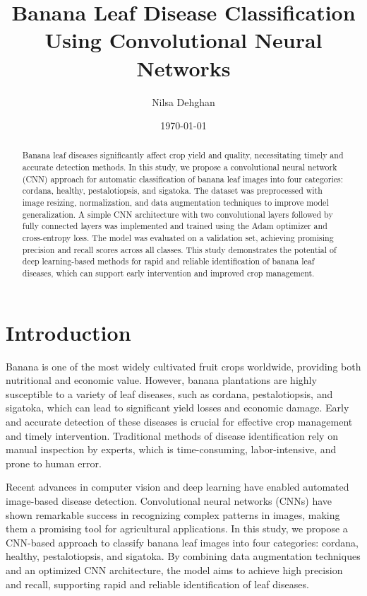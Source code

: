 \documentclass[11pt]{article}
\title{Banana Leaf Disease Classification Using Convolutional Neural Networks}
\author{Nilsa Dehghan}
\date{\today}
\begin{document}
\maketitle

\begin{abstract}
Banana leaf diseases significantly affect crop yield and quality, necessitating timely and accurate detection methods. In this study, we propose a convolutional neural network (CNN) approach for automatic classification of banana leaf images into four categories: cordana, healthy, pestalotiopsis, and sigatoka. The dataset was preprocessed with image resizing, normalization, and data augmentation techniques to improve model generalization. A simple CNN architecture with two convolutional layers followed by fully connected layers was implemented and trained using the Adam optimizer and cross-entropy loss. The model was evaluated on a validation set, achieving promising precision and recall scores across all classes. This study demonstrates the potential of deep learning-based methods for rapid and reliable identification of banana leaf diseases, which can support early intervention and improved crop management.
\end{abstract}

\section{Introduction}
Banana is one of the most widely cultivated fruit crops worldwide, providing both nutritional and economic value. However, banana plantations are highly susceptible to a variety of leaf diseases, such as cordana, pestalotiopsis, and sigatoka, which can lead to significant yield losses and economic damage. Early and accurate detection of these diseases is crucial for effective crop management and timely intervention. Traditional methods of disease identification rely on manual inspection by experts, which is time-consuming, labor-intensive, and prone to human error.

Recent advances in computer vision and deep learning have enabled automated image-based disease detection. Convolutional neural networks (CNNs) have shown remarkable success in recognizing complex patterns in images, making them a promising tool for agricultural applications. In this study, we propose a CNN-based approach to classify banana leaf images into four categories: cordana, healthy, pestalotiopsis, and sigatoka. By combining data augmentation techniques and an optimized CNN architecture, the model aims to achieve high precision and recall, supporting rapid and reliable identification of leaf diseases.
\end{document}
